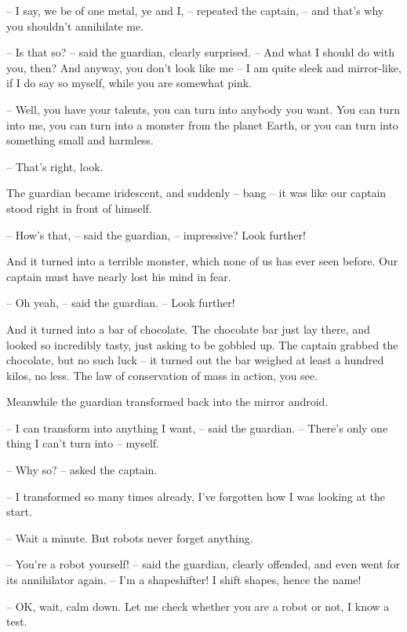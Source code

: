 \documentclass[ebook,oneside,final,openright]{memoir}
\begin{document}
– I say, we be of one metal, ye and I, – repeated the captain, – and that’s why you shouldn’t annihilate me.\par
– Is that so? – said the guardian, clearly surprised. – And what I should do with you, then? And anyway, you don’t look like me – I am quite sleek and mirror-like, if I do say so myself, while you are somewhat pink.\par
– Well, you have your talents, you can turn into anybody you want. You can turn into me, you can turn into a monster from the planet Earth, or you can turn into something small and harmless.\par
– That’s right, look.\par
\par
The guardian became iridescent, and suddenly – bang – it was like our captain stood right in front of himself.\par
– How’s that, – said the guardian, – impressive? Look further!\par
And it turned into a terrible monster, which none of us has ever seen before. Our captain must have nearly lost his mind in fear.\par
– Oh yeah, – said the guardian. – Look further!\par
\par
And it turned into a bar of chocolate. The chocolate bar just lay there, and looked so incredibly tasty, just asking to be gobbled up. The captain grabbed the chocolate, but no such luck – it turned out the bar weighed at least a hundred kilos, no less. The law of conservation of mass in action, you see.\par
\par
Meanwhile the guardian transformed back into the mirror android.\par
– I can transform into anything I want, – said the guardian. – There’s only one thing I can’t turn into – myself.\par
– Why so? – asked the captain.\par
– I transformed so many times already, I’ve forgotten how I was looking at the start.\par
– Wait a minute. But robots never forget anything.\par
– You’re a robot yourself! – said the guardian, clearly offended, and even went for its annihilator again. – I’m a shapeshifter! I shift shapes, hence the name!\par
– OK, wait, calm down. Let me check whether you are a robot or not, I know a test.\par
\end{document}
